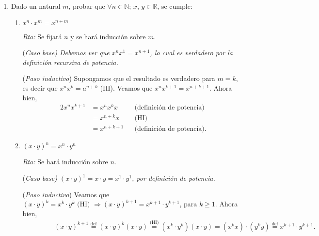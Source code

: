 \documentclass[a4paper,12pt,twoside,spanish,reqno]{amsbook}
\numberwithin{equation}{section}
\newcommand{\rta}{\noindent\textit{Rta: }}
\begin{document}
\begin{enumerate}
        
        
        
        
        
        
        
        
        \item Dado un natural $m$, probar que $\forall n \in {\mathbb N} $; $x$, $y \in {\mathbb R}$, se cumple:
            \begin{enumerate}
                \item $x^n \cdot x^m = x^{n+m}$
                
                \rta Se fijará $n$ y se hará inducción sobre $m$. 
                
                \noindent(\it Caso  base\rm) Debemos ver que $x^{n}x^1 = x^{n+1}$, lo cual es verdadero por la definición recursiva de potencia. 
                
                \noindent ({\it Paso  inductivo}) Supongamos que el resultado es verdadero para $m=k$, es decir que $x^{n}x^k = a^{n+k}$ (HI). Veamos que  $x^{n}x^{k+1} = x^{n+k+1}$. Ahora bien, 
                \begin{alignat*}2
                x^{n}x^{k+1} &= x^{n}x^{k}x&  & \text{(definición de potencia)} \\
                &= x^{n+k}x& & \text{(HI)} \\
                &= x^{n+k+1}&  & \text{(definición de potencia)}. 
                \end{alignat*}
                \item $(x\cdot y)^n=x^n\cdot y^n$
                
                \rta Se  hará inducción sobre $n$.
                
                \noindent(\it Caso  base\rm) $(x\cdot y)^1=x\cdot y = x^1\cdot y^1$, por definición de potencia. 
                
                \noindent ({\it Paso  inductivo}) Veamos que  $(x\cdot y)^k=x^k\cdot y^k \text{ (HI) } \Rightarrow (x\cdot y)^{k+1}=x^{k+1}\cdot y^{k+1}$, para $k \ge 1$. Ahora bien,
                \begin{multline*}
                \qquad\; \qquad (x\cdot y)^{k+1} \overset{\text{def}}{=} (x\cdot y)^{k} (x\cdot y) \overset{\text{(HI)}}{=} (x^{k}\cdot y^{k}) (x\cdot y) = (x^{k}x)\cdot (y^{k}y) \overset{\text{def}}{=}  x^{k+1}\cdot y^{k+1}.
                \end{multline*}
                
                 
                 

\end{enumerate}
\end{enumerate}
\end{document}
